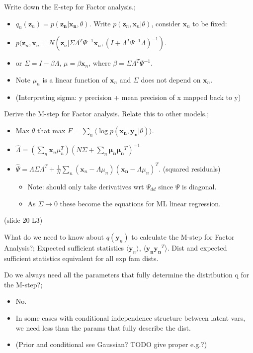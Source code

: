\documentclass{article}
\begin{document}
Write down the E-step for Factor analysis.; \begin{itemize} \item $q_n(\mathbf{z}_n) = p(\mathbf{z_n|x_n}, \theta)$. Write $p(\mathbf{z}_n, \mathbf{x}_n|\theta)$, consider $\mathbf{x}_n$ to be fixed: \item $p(\mathbf{z}_n, \mathbf{x}_n = N(\mathbf{z}_n | \Sigma\Lambda^T\Psi^{-1}\mathbf{x}_n, (I+\Lambda^T\Psi^{-1}\Lambda)^{-1})$.  \item or $\Sigma = I - \beta\Lambda$, $\mu = \beta\mathbf{x}_n$, where $\beta=\Sigma\Lambda^T\Psi^{-1}$.  \item Note $\mu_n$ is a linear function of $\mathbf{x}_n$ and $\Sigma$ does not depend on $\mathbf{x}_n$.  \item (Interpreting sigma: y precision + mean precision of x mapped back to y) \end{itemize}

Derive the M-step for Factor analysis. Relate this to other models.; \begin{itemize} \item Max $\theta$ that max $F=\sum_n \langle \log p(\mathbf{x_n, y_n}|\theta) \rangle$.  \item $\hat\Lambda = (\sum_n \mathbf{x}_n\mu_n^T)(N\Sigma+\sum_n\mathbf{\mu_n\mu_n}^T)^{-1}$ \item $\hat{\Psi} = \Lambda\Sigma\Lambda^T + \frac{1}{N}\sum_n(\mathbf{x}_n-\Lambda\mu_n)(\mathbf{x_n}-\Lambda\mu_n)^T$. (squared residuals)\begin{itemize} \item Note: should only take derivatives wrt $\Psi_{dd}$ since $\Psi$ is diagonal.  \item As $\Sigma\rightarrow 0$ these become the equations for ML linear regression.  \end{itemize} \end{itemize} (slide 20 L3)

What do we need to know about $q(\mathbf{y}_n)$ to calculate the M-step for Factor Analysis?; Expected sufficient statistics $\langle \mathbf{y}_n \rangle$, $\langle \mathbf{y_ny_n}^T \rangle$. Dist and expected sufficient statistics equivalent for all exp fam dists.

Do we always need all the parameters that fully determine the distribution q for the M-step?; \begin{itemize} \item No.  \item In some cases with conditional independence structure between latent vars, we need less than the params that fully describe the dist.  \item (Prior and conditional see Gaussian? TODO give proper e.g.?) \end{itemize}
\end{document}
